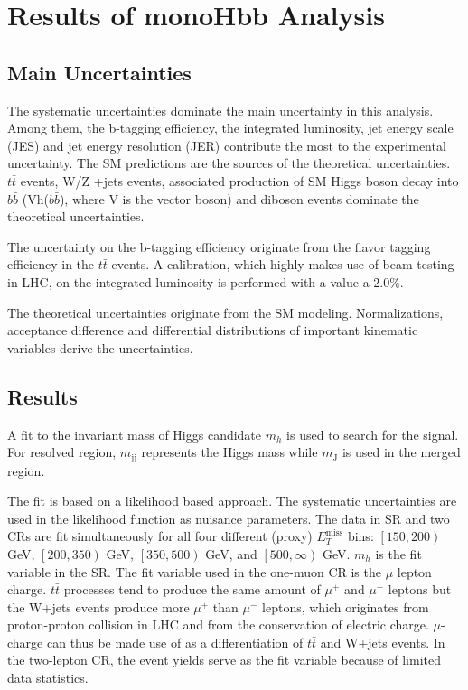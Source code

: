\documentclass[class=NCU_thesis, crop=false]{standalone}
\begin{document}
	
\chapter{Results of monoHbb Analysis}\label{result}

\section{Main Uncertainties}
	The systematic uncertainties dominate the main uncertainty in this analysis. Among them, the b-tagging efficiency, the integrated luminosity, jet energy scale (JES) and jet energy resolution (JER) contribute the most to the experimental uncertainty. The SM predictions are the sources of the theoretical uncertainties. $t\bar{t}$ events, W/Z +jets events, associated production of SM Higgs boson decay into $b\bar{b}$ (Vh($b\bar{b}$), where V is the vector boson) and diboson events dominate the theoretical uncertainties.

	The uncertainty on the b-tagging efficiency originate from the flavor tagging efficiency in the $t\bar{t}$ events. A calibration, which highly makes use of beam testing in LHC, on the integrated luminosity is performed with a value a 2.0\%.

	The theoretical uncertainties originate from the SM modeling. Normalizations, acceptance difference and differential distributions of important kinematic variables derive the uncertainties.

	\section{Results}
		A fit to the invariant mass of Higgs candidate $m_h$ is used to search for the signal. For resolved region, $m_{\mathrm{jj}}$ represents the Higgs mass while $m_{\mathrm{J}}$ is used in the merged region.

		The fit is based on a likelihood based approach. The systematic uncertainties are used in the likelihood function as nuisance parameters. The data in SR and two CRs are fit simultaneously for all four different (proxy) $E_T^{\mathrm{miss}}$ bins: $\left[150, 200\right)$ GeV, $\left[200, 350\right)$ GeV, $\left[350, 500\right)$ GeV, and $\left[500, \infty \right)$ GeV. $m_h$ is the fit variable in the SR. The fit variable used in the one-muon CR is the $\mu$ lepton charge. $t\bar{t}$ processes tend to produce the same amount of $\mu^+$ and $\mu^-$ leptons but the W+jets events produce more $\mu^+$ than $\mu^-$ leptons, which originates from proton-proton collision in LHC and from the conservation of electric charge. $\mu$-charge can thus be made use of as a differentiation of $t\bar{t}$ and W+jets events. In the two-lepton CR, the event yields serve as the fit variable because of limited data statistics.
\end{document}
